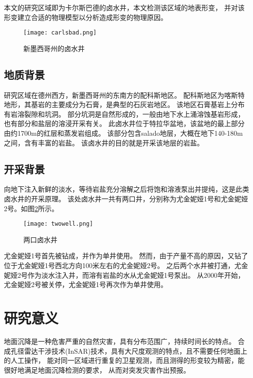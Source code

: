 本文的研究区域即为卡尔斯巴德的卤水井，本文检测该区域的地表形变，
并对该形变建立合适的物理模型以分析造成形变的物理原因。
\begin{figure}[htb]
  \centering
  \texttt{[image: carlsbad.png]}
  \caption{新墨西哥州的卤水井}
  \label{fig:carlsbad}
\end{figure}

\subsection{地质背景}
研究区域在德州西方，新墨西哥州的东南方的配科斯地区。
配科斯地区为喀斯特地形，其基岩的主要成分为石膏，是典型的石灰岩地区。
该地区石膏基岩上分布有岩溶裂隙和坑洞。
部分坑洞是自然形成的，一般由地下水上涌溶蚀基岩形成，也有部分和盐层的溶浸开采有关。
此卤水井位于特拉华盆地，该盆地的最上部分由约1700m的红层和蒸发岩组成。
该部分包含salado地层，大概在地下140-180m之间，含有丰富的岩盐。
该卤水井的目的就是开采该地层的岩盐。

\subsection{开采背景}
向地下注入新鲜的淡水，等待岩盐充分溶解之后将饱和溶液泵出并提纯，这是此类卤水井的开采原理。
该处卤水井一共有两口井，分别称为尤金妮娅1号和尤金妮娅2号。如图\ref{fig:twowell}所示。
\begin{figure}[htp]
  \centering
  \texttt{[image: twowell.png]}
  \caption{两口卤水井}
  \label{fig:twowell}
\end{figure}
尤金妮娅1号首先被钻成，并作为单井使用。
然而，由于产量不高的原因，又钻了位于尤金妮娅1号西北方向100米左右的尤金妮娅2号。
之后两个水井被打通，尤金妮娅2号作为淡水注入井，而溶有岩盐的水从尤金妮娅1号泵出。
从2000年开始，尤金妮娅2号被关停，尤金妮娅1号再次作为单井使用。

\section{研究意义}
地面沉降是一种危害严重的自然灾害，具有分布范围广，持续时间长的特点。
合成孔径雷达干涉技术(InSAR)技术，具有大尺度观测的特点，且不需要任何地面上的人工操作，
能对同一区域进行重复的卫星观测，而且测得的形变较为精密，能很好地满足地面沉降检测的要求，
从而对突发灾害作出预报。


